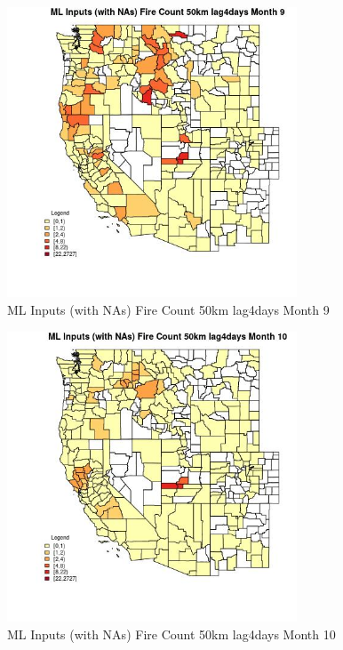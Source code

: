 \begin{figure} 
\centering  
\includegraphics[width=0.77\textwidth]{Code_Outputs/Report_ML_input_PM25_Step4_part_f_de_duplicated_aveswNAs_CountyFire_Count_50km_lag4daysmedianMonth9.jpg} 
\caption{\label{fig:Report_ML_input_PM25_Step4_part_f_de_duplicated_aveswNAsCountyFire_Count_50km_lag4daysmedianMonth9}ML Inputs (with NAs) Fire Count 50km lag4days Month 9} 
\end{figure} 
 

\begin{figure} 
\centering  
\includegraphics[width=0.77\textwidth]{Code_Outputs/Report_ML_input_PM25_Step4_part_f_de_duplicated_aveswNAs_CountyFire_Count_50km_lag4daysmedianMonth10.jpg} 
\caption{\label{fig:Report_ML_input_PM25_Step4_part_f_de_duplicated_aveswNAsCountyFire_Count_50km_lag4daysmedianMonth10}ML Inputs (with NAs) Fire Count 50km lag4days Month 10} 
\end{figure} 
 

